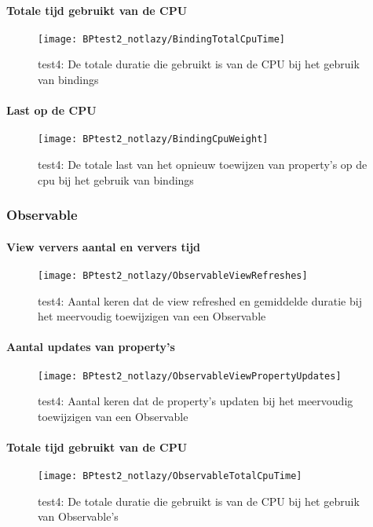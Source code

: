\paragraph{Totale tijd gebruikt van de CPU}
\begin{figure}[H]
    \centering
    \texttt{[image: BPtest2\_notlazy/BindingTotalCpuTime]} 
    \caption{test4: De totale duratie die gebruikt is van de CPU bij het gebruik van bindings}
    \label{fig:cpuUsageTimeBinding3}
\end{figure}
\paragraph{Last op de CPU}
\begin{figure}[H]
    \centering
    \texttt{[image: BPtest2\_notlazy/BindingCpuWeight]} 
    \caption{test4: De totale last van het opnieuw toewijzen van property's op de cpu bij het gebruik van bindings}
    \label{fig:cpuWeightBinding3}
\end{figure}

\subsubsection{Observable}
\paragraph{View ververs aantal en ververs tijd}
\begin{figure}[H]
    \centering
    \texttt{[image: BPtest2\_notlazy/ObservableViewRefreshes]} 
    \caption{test4: Aantal keren dat de view refreshed en gemiddelde duratie bij het meervoudig toewijzigen van een Observable}
    \label{fig:viewRefreshesObservable3}
\end{figure}
\paragraph{Aantal updates van property's}
\begin{figure}[H]
    \centering
    \texttt{[image: BPtest2\_notlazy/ObservableViewPropertyUpdates]} 
    \caption{test4: Aantal keren dat de property's updaten bij het meervoudig toewijzigen van een Observable}
    \label{fig:propertyUpdatesObservable3}
\end{figure}
\paragraph{Totale tijd gebruikt van de CPU}
\begin{figure}[H]
    \centering
    \texttt{[image: BPtest2\_notlazy/ObservableTotalCpuTime]} 
    \caption{test4: De totale duratie die gebruikt is van de CPU bij het gebruik van Observable's}
    \label{fig:cpuUsageTimeObservable3}
\end{figure}
